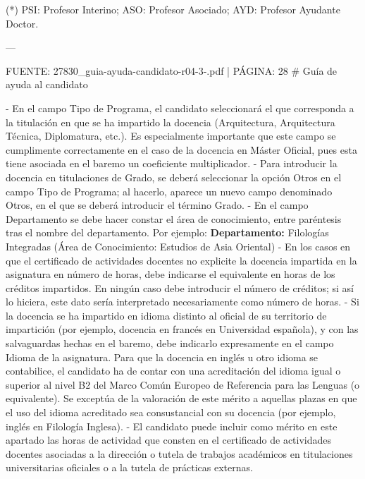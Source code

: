 \documentclass{article}
\begin{document}
\begin{itemize}
\begin{itemize}
\begin{scriptsize}
                  (*) PSI: Profesor Interino; ASO: Profesor Asociado; AYD: Profesor Ayudante Doctor.

                  ---

                  FUENTE: 27830\_guia-ayuda-candidato-r04-3-.pdf | PÁGINA: 28
                  \# Guía de ayuda al candidato

                  - En el campo Tipo de Programa, el candidato seleccionará el que corresponda a la titulación en que se ha impartido la docencia (Arquitectura, Arquitectura Técnica, Diplomatura, etc.). Es especialmente importante que este campo se cumplimente correctamente en el caso de la docencia en Máster Oficial, pues esta tiene asociada en el baremo un coeficiente multiplicador.
                  - Para introducir la docencia en titulaciones de Grado, se deberá seleccionar la opción Otros en el campo Tipo de Programa; al hacerlo, aparece un nuevo campo denominado Otros, en el que se deberá introducir el término Grado.
                  - En el campo Departamento se debe hacer constar el área de conocimiento, entre paréntesis tras el nombre del departamento. Por ejemplo:
                  \textbf{Departamento:} Filologías Integradas (Área de Conocimiento: Estudios de Asia Oriental)
                  - En los casos en que el certificado de actividades docentes no explicite la docencia impartida en la asignatura en número de horas, debe indicarse el equivalente en horas de los créditos impartidos. En ningún caso debe introducir el número de créditos; si así lo hiciera, este dato sería interpretado necesariamente como número de horas.
                  - Si la docencia se ha impartido en idioma distinto al oficial de su territorio de impartición (por ejemplo, docencia en francés en Universidad española), y con las salvaguardas hechas en el baremo, debe indicarlo expresamente en el campo Idioma de la asignatura. Para que la docencia en inglés u otro idioma se contabilice, el candidato ha de contar con una acreditación del idioma igual o superior al nivel B2 del Marco Común Europeo de Referencia para las Lenguas (o equivalente). Se exceptúa de la valoración de este mérito a aquellas plazas en que el uso del idioma acreditado sea consustancial con su docencia (por ejemplo, inglés en Filología Inglesa).
                  - El candidato puede incluir como mérito en este apartado las horas de actividad que consten en el certificado de actividades docentes asociadas a la dirección o tutela de trabajos académicos en titulaciones universitarias oficiales o a la tutela de prácticas externas.


\end{scriptsize}
\end{itemize}
\end{itemize}
\end{document}
